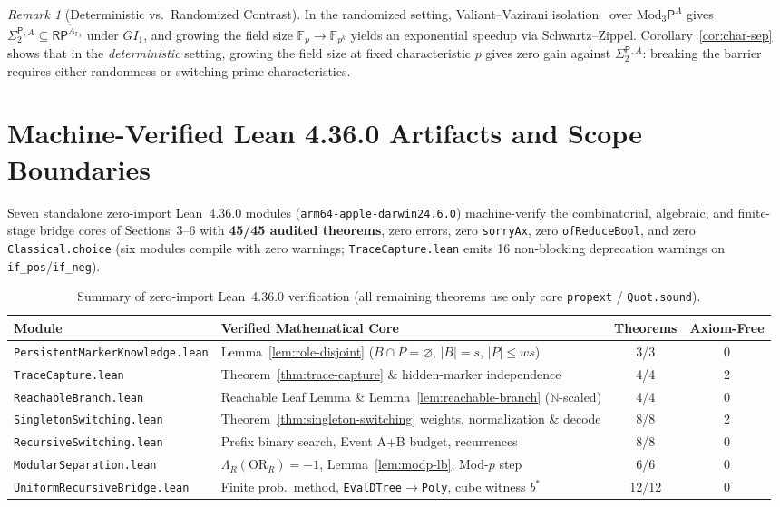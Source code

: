 \documentclass[11pt,a4paper]{article}
\theoremstyle{definition}
\theoremstyle{remark}
\newtheorem{remark}[theorem]{Remark}
\newcommand{\RP}{\mathsf{RP}}
\newcommand{\Modthree}{\mathrm{Mod}_3\mathsf{P}}
\newcommand{\SigTwo}{\Sigma_2^{\mathsf{P}}}
\newcommand{\OR}{\mathrm{OR}}
\newcommand{\F}{\mathbb{F}}
\newcommand{\GI}{GI_1}
\begin{document}
\begin{remark}[Deterministic vs.\ Randomized Contrast]
In the randomized setting, Valiant--Vazirani isolation~\cite{ValiantVazirani1986} over $\Modthree^A$ gives $\SigTwo{}^{,A} \subseteq \RP^{\widetilde{A}_{\F_3}}$ under $\GI$, and growing the field size $\F_p \to \F_{p^k}$ yields an exponential speedup via Schwartz--Zippel. Corollary~\ref{cor:char-sep} shows that in the \emph{deterministic} setting, growing the field size at fixed characteristic $p$ gives zero gain against $\SigTwo{}^{,A}$: breaking the barrier requires either randomness or switching prime characteristics.
\end{remark}

\appendix
\section{Machine-Verified Lean 4.36.0 Artifacts and Scope Boundaries}

Seven standalone zero-import Lean~4.36.0 modules (\texttt{arm64-apple-darwin24.6.0}) machine-verify the combinatorial, algebraic, and finite-stage bridge cores of Sections~3--6 with \textbf{45/45 audited theorems}, zero errors, zero \texttt{sorryAx}, zero \texttt{ofReduceBool}, and zero \texttt{Classical.choice} (six modules compile with zero warnings; \texttt{TraceCapture.lean} emits 16 non-blocking deprecation warnings on \texttt{if\_pos}/\texttt{if\_neg}).

\begin{table}[!htbp]
\centering
\begin{tabularx}{\linewidth}{lXcc}
\toprule
\textbf{Module} & \textbf{Verified Mathematical Core} & \textbf{Theorems} & \textbf{Axiom-Free} \\
\midrule
\texttt{PersistentMarkerKnowledge.lean} & Lemma~\ref{lem:role-disjoint} ($B \cap P = \varnothing$, $|B|=s$, $|P|\le ws$) & 3/3 & 0 \\
\texttt{TraceCapture.lean} & Theorem~\ref{thm:trace-capture} \& hidden-marker independence & 4/4 & 2 \\
\texttt{ReachableBranch.lean} & Reachable Leaf Lemma \& Lemma~\ref{lem:reachable-branch} ($\mathbb{N}$-scaled) & 4/4 & 0 \\
\texttt{SingletonSwitching.lean} & Theorem~\ref{thm:singleton-switching} weights, normalization \& decode & 8/8 & 2 \\
\texttt{RecursiveSwitching.lean} & Prefix binary search, Event A+B budget, recurrences & 8/8 & 0 \\
\texttt{ModularSeparation.lean} & $\Lambda_R(\OR_R)=-1$, Lemma~\ref{lem:modp-lb}, Mod-$p$ step & 6/6 & 0 \\
\texttt{UniformRecursiveBridge.lean} & Finite prob.\ method, \texttt{EvalDTree}$\to$\texttt{Poly}, cube witness $b^*$ & 12/12 & 0 \\
\bottomrule
\end{tabularx}
\caption{Summary of zero-import Lean~4.36.0 verification (all remaining theorems use only core \texttt{propext} / \texttt{Quot.sound}).}
\end{table}
\end{document}
